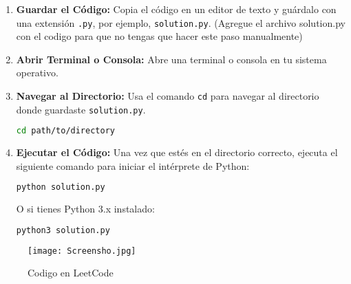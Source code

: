 \documentclass[12pt]{article}
\begin{document}
\begin{enumerate}
    \item \textbf{Guardar el Código:} Copia el código en un editor de texto y guárdalo con una extensión \texttt{.py}, por ejemplo, \texttt{solution.py}. (Agregue el archivo solution.py con el codigo para que no tengas que hacer este paso manualmente)
    
    \item \textbf{Abrir Terminal o Consola:} Abre una terminal o consola en tu sistema operativo.
    
    \item \textbf{Navegar al Directorio:} Usa el comando \texttt{cd} para navegar al directorio donde guardaste \texttt{solution.py}.
    \begin{lstlisting}[language=bash]
    cd path/to/directory
    \end{lstlisting}
    
    \item \textbf{Ejecutar el Código:} Una vez que estés en el directorio correcto, ejecuta el siguiente comando para iniciar el intérprete de Python:
    \begin{lstlisting}[language=bash]
    python solution.py
    \end{lstlisting}
    O si tienes Python 3.x instalado:
    \begin{lstlisting}[language=bash]
    python3 solution.py
    \end{lstlisting}
\end{enumerate}

\begin{figure}[h]
    \centering
    \texttt{[image: Screensho.jpg]}
    \caption{Codigo en LeetCode}
    \label{fig:enter-label}
\end{figure}
\end{document}
